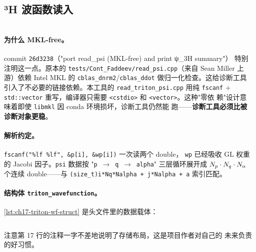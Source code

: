 \subsection{³H 波函数读入}
\label{subsec:ch17-code-read}

\begin{lstlisting}[style=cpp, caption={\texttt{read\_triton\_psi.cpp} —— ³H 波函数 ASCII 解析 (lines 1--48)}, label={lst:ch17-read-triton-psi}]
\end{lstlisting}


\paragraph{为什么 MKL-free。}
commit \texttt{26d3238}（"port read\_psi (MKL-free) and print ψ\_3H summary"）
特别注明这一点。原本的 \texttt{tests/Cont\_Faddeev/read\_psi.cpp}（来自
Sean Miller 上游）依赖 Intel MKL 的 \texttt{cblas\_dnrm2}/\texttt{cblas\_ddot}
做归一化检查。这给诊断工具引入了不必要的链接依赖。本工具的
\texttt{read\_triton\_psi.cpp} 用纯 \texttt{fscanf} + \texttt{std::vector}
重写，编译器只需要 \texttt{<cstdio>} 和 \texttt{<vector>}。这种"零依
赖"设计意味着即使 \texttt{libmkl} 因 conda 环境损坏，诊断工具仍然能
跑——\textbf{诊断工具必须比被诊断对象更稳}。

\paragraph{解析约定。}
\texttt{fscanf("\%lf \%lf", \&p[i], \&wp[i])} 一次读两个 double，
\texttt{wp} 已经吸收 GL 权重的 Jacobi 因子。\texttt{psi} 数据按
"\texttt{p $\to$ q $\to$ alpha}" 三层循环展开成 \(N_p \cdot N_q \cdot N_\alpha\)
个连续 double——与 \texttt{(size\_t)i*Nq*Nalpha + j*Nalpha + a} 索引匹配。

\paragraph{结构体 \texttt{triton\_wavefunction}。}
\cref{lst:ch17-triton-wf-struct} 是头文件里的数据载体：

\begin{lstlisting}[style=cpp, caption={\texttt{triton\_wavefunction} 结构体 (read\_triton\_psi.h)}, label={lst:ch17-triton-wf-struct}]
\end{lstlisting}


注意第 17 行的注释一字不差地说明了存储布局，这是项目作者对自己的
未来负责的好习惯。


